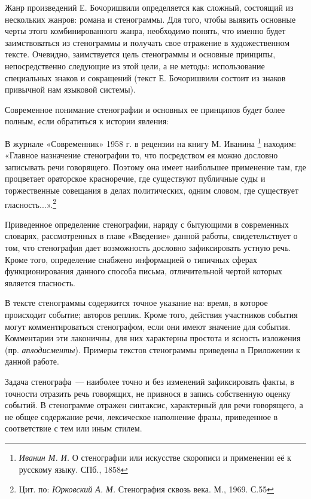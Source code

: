 \documentclass{kursa4}
\begin{document}
{      Жанр произведений Е. Бочоришвили определяется как сложный, состоящий
      из нескольких жанров: романа и стенограммы. Для того, чтобы выявить
      основные черты этого комбинированного жанра, необходимо понять, что
      именно будет заимствоваться из стенограммы и получать свое отражение в
      художественном тексте. Очевидно, заимствуется цель стенограммы и
      основные принципы, непосредственно следующие из этой цели, а не методы:
      использование специальных знаков и сокращений (текст Е. Бочоришвили
      состоит из знаков привычной нам языковой системы). 

      Современное понимание стенографии и основных ее принципов будет
      более полным, если обратиться к истории явления:

      В журнале «Современник» 1958 г. в рецензии на
      книгу М. Иванина \footnote{\textit{Иванин М. И. }О стенографии или искусстве скорописи и применении её к русскому языку. СПб., 1858} находим: «Главное назначение стенографии
      то, что посредством ея можно дословно записывать речи говорящего.
      Поэтому она имеет наибольшее применение там, где процветает ораторское
      красноречие, где существуют публичные суды и торжественные совещания в
      делах политических, одним словом, где существует
      гласность...».\footnote{{ Цит. по:
      }\textit{{Юрковский А. М.
      }}{Стенография сквозь века. М., 1969.
      С.55}}{ }

       Приведенное определение стенографии, наряду с бытующими в
      современных словарях, рассмотренных в главе «Введение» данной работы,
      свидетельствует о том, что стенография дает возможность дословно
      зафиксировать устную речь. Кроме того, определение снабжено
      информацией о типичных сферах функционирования данного способа
      письма, отличительной чертой которых является гласность. 

      В тексте стенограммы содержится точное указание на: время, в которое
      происходит событие; авторов реплик. Кроме того, действия участников
      события могут комментироваться стенографом, если они имеют значение для
      события. Комментарии эти лаконичны, для них характерны простота и
      ясность изложения (пр. \textit{аплодисменты}). Примеры текстов
      стенограммы приведены в Приложении к данной работе. 

      Задача стенографа~--- наиболее точно и без изменений зафиксировать
      факты, в точности отразить речь говорящих, не привнося в запись
      собственную оценку событий. В стенограмме отражен синтаксис,
      характерный для речи говорящего, а не общее содержание речи,
      лексическое наполнение фразы, приведенное в соответствие с тем или иным
      стилем. 

}
\end{document}
